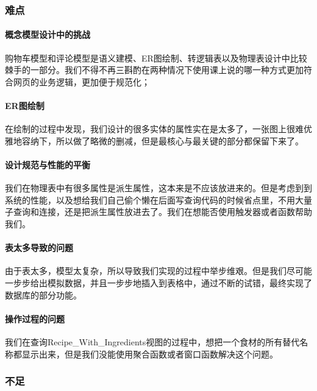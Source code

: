\documentclass[11pt,a4paper]{article}
\renewcommand{\_}{\origunderscore\allowbreak}
\begin{document}
\subsubsection{难点}

\paragraph{概念模型设计中的挑战} 

购物车模型和评论模型是语义建模、ER图绘制、转逻辑表以及物理表设计中比较棘手的一部分。我们不得不再三斟酌在两种情况下使用课上说的哪一种方式更加符合网页的业务逻辑，更加便于规范化；

\paragraph{ER图绘制} 

在绘制的过程中发现，我们设计的很多实体的属性实在是太多了，一张图上很难优雅地容纳下，所以做了略微的删减，但是最核心与最关键的部分都保留下来了。

\paragraph{设计规范与性能的平衡}

我们在物理表中有很多属性是派生属性，这本来是不应该放进来的。但是考虑到到系统的性能，以及想给我们自己偷个懒在后面写查询代码的时候省点里，不用大量子查询和连接，还是把派生属性放进去了。我们在想能否使用触发器或者函数帮助我们。

\paragraph{表太多导致的问题}

由于表太多，模型太复杂，所以导致我们实现的过程中举步维艰。但是我们尽可能一步步给出模拟数据，并且一步步地插入到表格中，通过不断的试错，最终实现了数据库的部分功能。

\paragraph{操作过程的问题}

我们在查询Recipe_With_Ingredients视图的过程中，想把一个食材的所有替代名称都显示出来，但是我们没能使用聚合函数或者窗口函数解决这个问题。

\subsubsection{不足}
\end{document}
